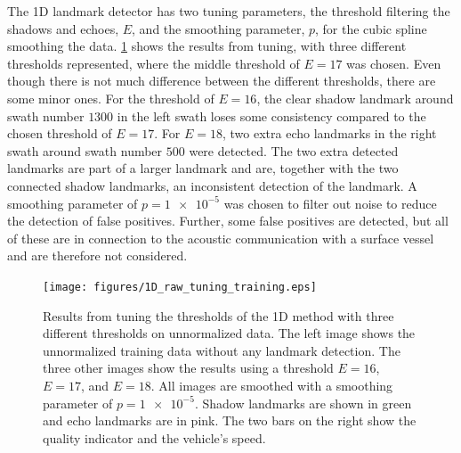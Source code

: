 The 1D landmark detector has two tuning parameters, the threshold filtering the shadows and echoes, $E$, and the smoothing parameter, $p$, for the cubic spline smoothing the data. \cref{fig:1D_raw_tuning_training} shows the results from tuning, with three different thresholds represented, where the middle threshold of $E = 17$ was chosen. Even though there is not much difference between the different thresholds, there are some minor ones. For the threshold of $E = 16$, the clear shadow landmark around swath number $1300$ in the left swath loses some consistency compared to the chosen threshold of $E = 17$. For $E = 18$, two extra echo landmarks in the right swath around swath number $500$ were detected. The two extra detected landmarks are part of a larger landmark and are, together with the two connected shadow landmarks, an inconsistent detection of the landmark. A smoothing parameter of $p = \num{1e-5}$ was chosen to filter out noise to reduce the detection of false positives. Further, some false positives are detected, but all of these are in connection to the acoustic communication with a surface vessel and are therefore not considered. 

\begin{figure}   %
  \centering
  \texttt{[image: figures/1D\_raw\_tuning\_training.eps]}
  \caption[Results of tuning threshold of the 1D method]{Results from tuning the thresholds of the 1D method with three different thresholds on unnormalized data. The left image shows the unnormalized training data without any landmark detection. The three other images show the results using a threshold $E = 16$, $E = 17$, and $E = 18$. All images are smoothed with a smoothing parameter of $p = \num{1e-5}$. Shadow landmarks are shown in green and echo landmarks are in pink. The two bars on the right show the quality indicator and the vehicle's speed.}
  \label{fig:1D_raw_tuning_training}
\end{figure}

